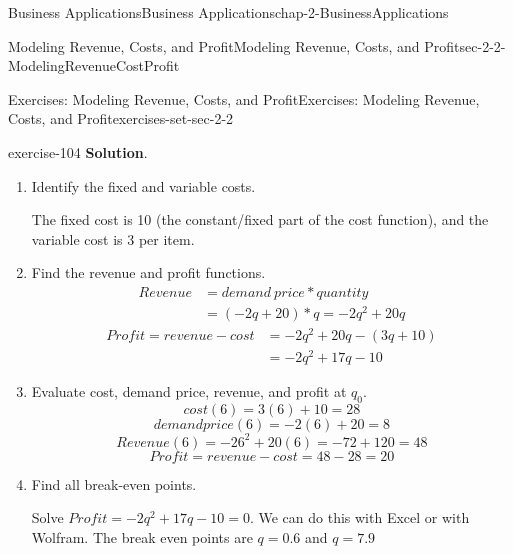 \documentclass[oneside,10pt,]{book}
\numberwithin{equation}{section}
\newcommand{\amp}{&}
\begin{document}
\begin{chapterptx}{Business Applications}{}{Business Applications}{}{}{chap-2-BusinessApplications}
\begin{sectionptx}{Modeling Revenue, Costs, and Profit}{}{Modeling Revenue, Costs, and Profit}{}{}{sec-2-2-ModelingRevenueCostProfit}
\begin{exercises-subsection-numberless}{Exercises: Modeling Revenue, Costs, and Profit}{}{Exercises: Modeling Revenue, Costs, and Profit}{}{}{exercises-set-sec-2-2}
\begin{exercisegroup}
\begin{divisionexerciseeg}{1}{}{}{exercise-104}
\noindent\textbf{Solution}.\hypertarget{solution-50}{}\quad%
\leavevmode%
\begin{enumerate}[label=(\alph*)]
\item\hypertarget{li-196}{}\hypertarget{p-686}{}%
Identify the fixed and variable costs.%
\par
\hypertarget{p-687}{}%
The fixed cost is \textdollar{}10 (the constant\slash{}fixed part of the cost function), and the variable cost is \textdollar{}3 per item.%
\item\hypertarget{li-197}{}\hypertarget{p-688}{}%
Find the revenue and profit functions.%
%
\begin{align*}
Revenue\amp=demand\ price*quantity\\
\amp=(-2 q+20)*q=-2 q^2  +20 q
\end{align*}
%
\begin{align*}
Profit=revenue-cost \amp=-2 q^2  +20q-(3q+10)\\
\amp=-2 q^2+17q-10
\end{align*}
\item\hypertarget{li-198}{}\hypertarget{p-689}{}%
Evaluate cost, demand price, revenue, and profit at \(q_0\).%
%
\begin{equation*}
cost(6)=3 (6)+10=28
\end{equation*}
%
\begin{equation*}
demand price(6)=-2 (6)+20=8
\end{equation*}
%
\begin{equation*}
Revenue(6)=-2 6^2  +20 (6)=-72+120=48
\end{equation*}
%
\begin{equation*}
Profit=revenue-cost =48-28=20
\end{equation*}
\item\hypertarget{li-199}{}\hypertarget{p-690}{}%
Find all break-even points.%
\par
\hypertarget{p-691}{}%
Solve \(Profit=-2 q^2+17q-10=0\). We can do this with Excel or with Wolfram. The break even points are \(q = 0.6\) and \(q = 7.9\)%
\begin{sidebyside}{1}{0}{0}{0}%
\begin{sbspanel}{1}%

\end{sbspanel}
\end{sidebyside}
\end{enumerate}
\end{divisionexerciseeg}
\end{exercisegroup}
\end{exercises-subsection-numberless}
\end{sectionptx}
\end{chapterptx}
\end{document}
